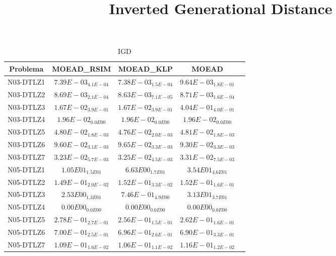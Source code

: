 \documentclass{article}
\title{Inverted Generational Distance}
\author{}
\begin{document}
\maketitle
\begin{table*}[ht!]
\scriptsize
\caption{IGD}
\centering\begin{tabular}{|c||c||c||c||c|} \hline
Problema &MOEAD_RSIM &MOEAD_KLP &MOEAD\\\hline
N03-DTLZ1 &\cellcolor{gray25}$7.39E-03_{4.1E-04}$ &\cellcolor{gray95}$7.38E-03_{1.5E-04}$ &$9.64E-03_{1.8E-01}$\\ 
\hline
N03-DTLZ2 &\cellcolor{gray25}$8.69E-03_{2.1E-04}$ &\cellcolor{gray95}$8.63E-03_{7.1E-05}$ &$8.71E-03_{1.6E-04}$\\ 
\hline
N03-DTLZ3 &\cellcolor{gray95}$1.67E-02_{3.9E-01}$ &\cellcolor{gray25}$1.67E-02_{3.9E-01}$ &$4.04E-01_{4.0E-01}$\\ 
\hline
N03-DTLZ4 &\cellcolor{gray95}$1.96E-02_{0.0E00}$ &\cellcolor{gray25}$1.96E-02_{0.0E00}$ &$1.96E-02_{0.0E00}$\\ 
\hline
N03-DTLZ5 &\cellcolor{gray25}$4.80E-02_{1.8E-03}$ &\cellcolor{gray95}$4.76E-02_{2.0E-03}$ &$4.81E-02_{1.8E-03}$\\ 
\hline
N03-DTLZ6 &\cellcolor{gray25}$9.60E-02_{3.1E-03}$ &$9.65E-02_{3.3E-03}$ &\cellcolor{gray95}$9.30E-02_{3.3E-03}$\\ 
\hline
N03-DTLZ7 &\cellcolor{gray95}$3.23E-02_{5.7E-03}$ &\cellcolor{gray25}$3.25E-02_{4.5E-03}$ &$3.31E-02_{7.5E-03}$\\ 
\hline
N05-DTLZ1 &\cellcolor{gray25}$1.05E01_{1.5E01}$ &\cellcolor{gray95}$6.63E00_{1.7E01}$ &$3.54E01_{4.6E01}$\\ 
\hline
N05-DTLZ2 &\cellcolor{gray95}$1.49E-01_{2.0E-02}$ &\cellcolor{gray25}$1.52E-01_{3.3E-02}$ &$1.52E-01_{1.6E-01}$\\ 
\hline
N05-DTLZ3 &\cellcolor{gray25}$2.53E00_{1.3E01}$ &\cellcolor{gray95}$7.46E-01_{4.9E00}$ &$3.13E01_{3.7E01}$\\ 
\hline
N05-DTLZ4 &\cellcolor{gray95}$0.00E00_{0.0E00}$ &\cellcolor{gray25}$0.00E00_{0.0E00}$ &$0.00E00_{0.0E00}$\\ 
\hline
N05-DTLZ5 &$2.78E-01_{2.7E-01}$ &\cellcolor{gray95}$2.56E-01_{1.5E-01}$ &\cellcolor{gray25}$2.62E-01_{1.6E-01}$\\ 
\hline
N05-DTLZ6 &$7.00E-01_{2.5E-01}$ &\cellcolor{gray25}$6.96E-01_{2.6E-01}$ &\cellcolor{gray95}$6.90E-01_{3.3E-01}$\\ 
\hline
N05-DTLZ7 &\cellcolor{gray25}$1.09E-01_{1.6E-02}$ &\cellcolor{gray95}$1.06E-01_{1.1E-02}$ &$1.16E-01_{1.2E-02}$\\ 

\end{tabular}
\end{table*}
\end{document}
